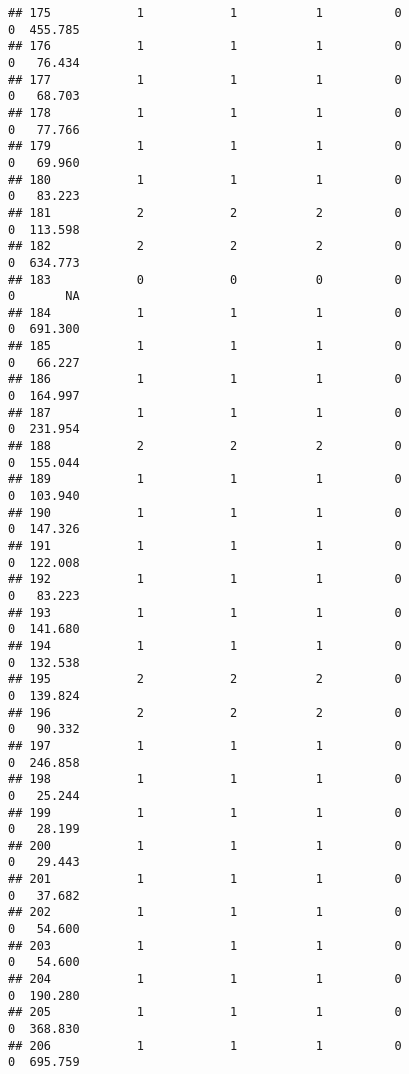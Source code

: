\documentclass[
]{article}
\begin{document}
\begin{verbatim}
## 175            1            1           1          0                0  455.785
## 176            1            1           1          0                0   76.434
## 177            1            1           1          0                0   68.703
## 178            1            1           1          0                0   77.766
## 179            1            1           1          0                0   69.960
## 180            1            1           1          0                0   83.223
## 181            2            2           2          0                0  113.598
## 182            2            2           2          0                0  634.773
## 183            0            0           0          0                0       NA
## 184            1            1           1          0                0  691.300
## 185            1            1           1          0                0   66.227
## 186            1            1           1          0                0  164.997
## 187            1            1           1          0                0  231.954
## 188            2            2           2          0                0  155.044
## 189            1            1           1          0                0  103.940
## 190            1            1           1          0                0  147.326
## 191            1            1           1          0                0  122.008
## 192            1            1           1          0                0   83.223
## 193            1            1           1          0                0  141.680
## 194            1            1           1          0                0  132.538
## 195            2            2           2          0                0  139.824
## 196            2            2           2          0                0   90.332
## 197            1            1           1          0                0  246.858
## 198            1            1           1          0                0   25.244
## 199            1            1           1          0                0   28.199
## 200            1            1           1          0                0   29.443
## 201            1            1           1          0                0   37.682
## 202            1            1           1          0                0   54.600
## 203            1            1           1          0                0   54.600
## 204            1            1           1          0                0  190.280
## 205            1            1           1          0                0  368.830
## 206            1            1           1          0                0  695.759

\end{verbatim}
\end{document}
